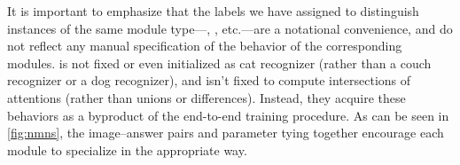 It is important to emphasize that the labels we have assigned to distinguish
instances of the same module type---, , etc.---are a
notational convenience, and do not reflect any manual specification of the
behavior of the corresponding modules.  is not fixed or even
initialized %
as cat recognizer (rather than a couch recognizer or a dog recognizer), and
 isn't fixed to compute intersections of attentions (rather
than unions or differences). Instead, they acquire these behaviors as a
byproduct of the end-to-end training procedure. As can be seen in
\autoref{fig:nmns},
the image--answer pairs and parameter tying together encourage each module to
specialize in the appropriate way.
